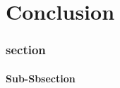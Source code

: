 \chapter{Conclusion}
\label{sec:Section07}

\subsection{section}
\label{sec:Section0x.a-}

\subsubsection{Sub-Sbsection}



\newpage
    

